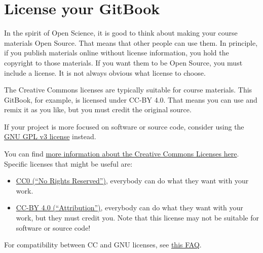 \documentclass[
]{book}
\providecommand{\tightlist}{%
  \setlength{\itemsep}{0pt}\setlength{\parskip}{0pt}}
\begin{document}
\hypertarget{license-your-gitbook}{%
\chapter{License your GitBook}\label{license-your-gitbook}}

In the spirit of Open Science, it is good to think about making your course materials Open Source. That means that other people can use them. In principle, if you publish materials online without license information, you hold the copyright to those materials. If you want them to be Open Source, you must include a license. It is not always obvious what license to choose.

The Creative Commons licenses are typically suitable for course materials. This GitBook, for example, is licensed under CC-BY 4.0. That means you can use and remix it as you like, but you must credit the original source.

If your project is more focused on software or source code, consider using the \href{https://www.gnu.org/licenses/gpl-3.0.en.html}{GNU GPL v3 license} instead.

You can find \href{https://creativecommons.org/share-your-work/licensing-examples}{more information about the Creative Commons Licenses here}. Specific licenses that might be useful are:

\begin{itemize}
\tightlist
\item
  \href{https://creativecommons.org/share-your-work/public-domain/cc0/}{CC0 (``No Rights Reserved'')}, everybody can do what they want with your work.
\item
  \href{https://creativecommons.org/licenses/by/4.0/}{CC-BY 4.0 (``Attribution'')}, everybody can do what they want with your work, but they must credit you. Note that this license may not be suitable for software or source code!
\end{itemize}

For compatibility between CC and GNU licenses, see \href{https://creativecommons.org/faq/\#Can_I_apply_a_Creative_Commons_license_to_software.3F}{this FAQ}.

  
\end{document}
